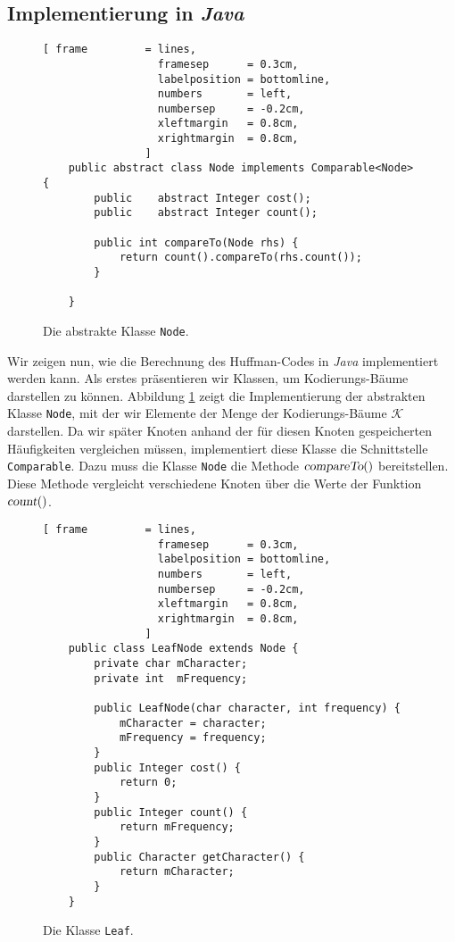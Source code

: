 \subsection{Implementierung in \textsl{Java}}
\begin{figure}[!ht]
\centering
\begin{Verbatim}[ frame         = lines, 
                  framesep      = 0.3cm, 
                  labelposition = bottomline,
                  numbers       = left,
                  numbersep     = -0.2cm,
                  xleftmargin   = 0.8cm,
                  xrightmargin  = 0.8cm,
                ]
    public abstract class Node implements Comparable<Node> {
    	public    abstract Integer cost();
    	public    abstract Integer count();
    
    	public int compareTo(Node rhs) {
    		return count().compareTo(rhs.count());
    	}
    
    }
\end{Verbatim}
\vspace*{-0.3cm}
\caption{Die abstrakte Klasse \texttt{Node}.}
\label{fig:Huffman/Node.java}
\end{figure}

\noindent
Wir zeigen nun, wie die Berechnung des Huffman-Codes in \textsl{Java} implementiert werden
kann.  Als erstes pr\"asentieren wir Klassen, um Kodierungs-B\"aume darstellen zu
k\"onnen.  Abbildung \ref{fig:Huffman/Node.java} zeigt die Implementierung der abstrakten
Klasse \texttt{Node}, mit der wir Elemente der Menge der Kodierungs-B\"aume $\mathcal{K}$ darstellen.
Da wir sp\"ater Knoten anhand der f\"ur diesen Knoten  gespeicherten H\"aufigkeiten vergleichen
m\"ussen, implementiert diese Klasse die Schnittstelle \texttt{Comparable}.
Dazu muss die Klasse \texttt{Node} die Methode $\textsl{compareTo}()$ bereitstellen.  
Diese Methode vergleicht verschiedene Knoten \"uber die Werte der Funktion $\textsl{count}()$.

\begin{figure}[!ht]
\centering
\begin{Verbatim}[ frame         = lines, 
                  framesep      = 0.3cm, 
                  labelposition = bottomline,
                  numbers       = left,
                  numbersep     = -0.2cm,
                  xleftmargin   = 0.8cm,
                  xrightmargin  = 0.8cm,
                ]
    public class LeafNode extends Node {
        private char mCharacter;
        private int  mFrequency;
        
        public LeafNode(char character, int frequency) {
            mCharacter = character;
            mFrequency = frequency;
        }
        public Integer cost() {
            return 0;
        }
        public Integer count() {
            return mFrequency;
        }
        public Character getCharacter() {
            return mCharacter;
        }
    }
\end{Verbatim}
\vspace*{-0.3cm}
\caption{Die Klasse \texttt{Leaf}.}
\label{fig:Leaf.java}
\end{figure}

